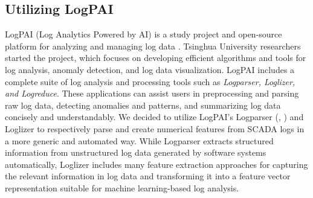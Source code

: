       \clearpage

  \subsection{Utilizing LogPAI}
    LogPAI (Log Analytics Powered by AI) is a study project and open-source platform for analyzing and managing log data \cite{LogPAI}. 
    Tsinghua University researchers started the project, which focuses on developing efficient algorithms and tools for log analysis, anomaly detection, and log data visualization.
    LogPAI includes a complete suite of log analysis and processing tools such as \emph{Logparser, Loglizer, and Logreduce}. 
    These applications can assist users in preprocessing and parsing raw log data, detecting anomalies and patterns, and summarizing log data concisely and understandably.
    We decided to utilize LogPAI's Logparser (\cite{Logparser_1}, \cite{Logparser_2}) and Loglizer \cite{Loglizer} to respectively parse and create numerical features from 
    SCADA logs in a more generic and automated way. While Logparser extracts structured information from unstructured log data generated by software systems automatically,
    Loglizer includes many feature extraction approaches for capturing the relevant information in log data and transforming it into a feature vector representation suitable 
    for machine learning-based log analysis. \\

